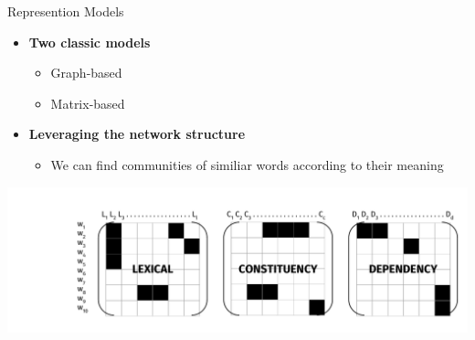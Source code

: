 \documentclass[10pt,=table]{beamer}
\begin{document}
\begin{frame}{Represention Models}
\begin{itemize}
\item \textbf{Two classic models}
	\begin{itemize}
		\item Graph-based 
		\item Matrix-based
	\end{itemize}
\item \textbf{Leveraging the network structure}
	\begin{itemize}
		\item We can find communities of similiar words according to their meaning
	\end{itemize}
\end{itemize}
\begin{overprint}
	  \centering
	      \includegraphics[width=.8\linewidth]{image2/Chapitre1/feature_types.pdf}	
\end{overprint}

\end{frame}
\end{document}
